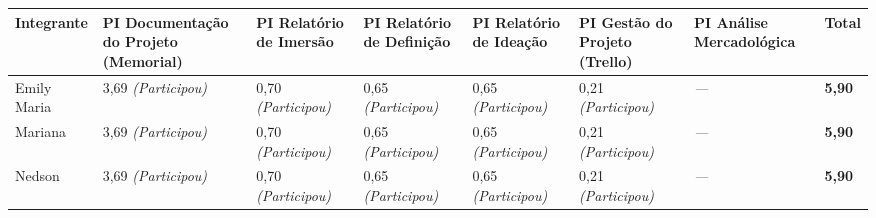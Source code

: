 \documentclass[
  sigconf,
  nonacm, %
  language=portuguese
]{acmart}
\begin{document}
\begin{tabularx}{\linewidth}{@{} X X X X X X X p{2.5cm} @{}}
\toprule
\textbf{Integrante} & \textbf{\small PI Documentação do Projeto (Memorial)} & \textbf{\small PI Relatório de Imersão} & \textbf{\small PI Relatório de Definição} & \textbf{\small PI Relatório de Ideação} & \textbf{\small PI Gestão do Projeto (Trello)} & \textbf{\small PI Análise Mercadológica} & \textbf{Total} \\
\midrule
Emily Maria & 3,69 \textit{(Participou)} & 0,70 \textit{(Participou)} & 0,65 \textit{(Participou)} & 0,65 \textit{(Participou)} & 0,21 \textit{(Participou)} & \textit{---} & \textbf{5,90} \\
Mariana & 3,69 \textit{(Participou)} & 0,70 \textit{(Participou)} & 0,65 \textit{(Participou)} & 0,65 \textit{(Participou)} & 0,21 \textit{(Participou)} & \textit{---} & \textbf{5,90} \\
Nedson & 3,69 \textit{(Participou)} & 0,70 \textit{(Participou)} & 0,65 \textit{(Participou)} & 0,65 \textit{(Participou)} & 0,21 \textit{(Participou)} & \textit{---} & \textbf{5,90} \\
\bottomrule
\end{tabularx}
\end{document}
